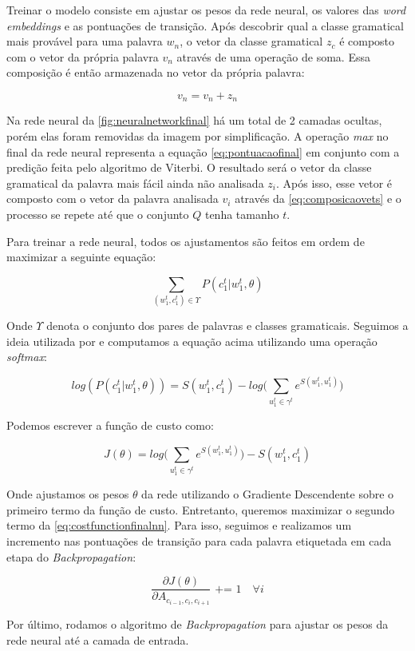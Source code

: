 Treinar o modelo consiste em ajustar os pesos da rede neural, os valores das \textit{word embeddings} e as pontuações de transição. Após descobrir qual a classe gramatical mais provável para uma palavra $w_n$, o vetor da classe gramatical $z_c$ é composto com o vetor da própria palavra $v_n$ através de uma operação de soma. Essa composição é então armazenada no vetor da própria palavra:

\begin{equation} \label{eq:composicaovets}
v_n = v_n + z_n
\end{equation}

Na rede neural da \autoref{fig:neuralnetworkfinal} há um total de 2 camadas ocultas, porém elas foram removidas da imagem por simplificação. A operação \textit{max} no final da rede neural representa a equação \autoref{eq:pontuacaofinal} em conjunto com a predição feita pelo algoritmo de Viterbi. O resultado será o vetor da classe gramatical da palavra mais fácil ainda não analisada $z_i$. Após isso, esse vetor é composto com o vetor da palavra analisada $v_i$ através da \autoref{eq:composicaovets} e o processo se repete até que o conjunto $Q$ tenha tamanho $t$.

Para treinar a rede neural, todos os ajustamentos são feitos em ordem de maximizar a seguinte equação:

\begin{equation}
\sum\limits_{(w_1^t,c_1^t) \in \Upsilon} P(c_1^t|w_1^t,\theta) \nonumber
\end{equation}

Onde $\Upsilon$ denota o conjunto dos pares de palavras e classes gramaticais. Seguimos a ideia utilizada por  e computamos a equação acima utilizando uma operação \textit{softmax}:

\begin{equation}
log(P(c_1^t|w_1^t,\theta)) = S(w_1^t, c_1^t) - log\Bigg(\sum\limits_{u_1^t \in \gamma^t} e^{S(w_1^t, u_1^t)} \Bigg) \nonumber
\end{equation}

Podemos escrever a função de custo como:

\begin{equation} \label{eq:costfunctionfinalnn}
J(\theta) = log\Bigg(\sum\limits_{u_1^t \in \gamma^t} e^{S(w_1^t, u_1^t)} \Bigg) - S(w_1^t, c_1^t)
\end{equation}

Onde ajustamos os pesos $\theta$ da rede utilizando o Gradiente Descendente sobre o primeiro termo da função de custo.  Entretanto, queremos maximizar o segundo termo da \autoref{eq:costfunctionfinalnn}. Para isso, seguimos \cite{fonseca2015evaluating} e realizamos um incremento nas pontuações de transição para cada palavra etiquetada em cada etapa do \textit{Backpropagation}:

\begin{equation}
\frac{\partial J(\theta)}{\partial A_{c_{i-1}, c_{i}, c_{i+1}}} \text{ += } 1 \quad \forall i \nonumber
\end{equation}

Por último, rodamos o algoritmo de \textit{Backpropagation} para ajustar os pesos da rede neural até a camada de entrada. 